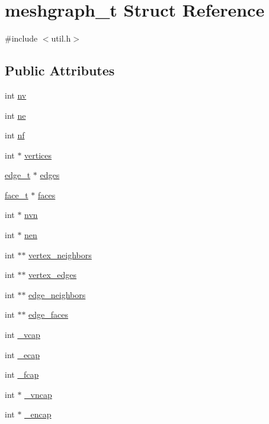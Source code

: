 \hypertarget{structmeshgraph__t}{
\section{meshgraph\_\-t Struct Reference}
\label{structmeshgraph__t}
}


{\ttfamily \#include $<$util.h$>$}

\subsection*{Public Attributes}
\begin{DoxyCompactItemize}
\item 
int \hyperlink{structmeshgraph__t_a5b1f3991b63e3058c62127b0eae471da}{nv}
\item 
int \hyperlink{structmeshgraph__t_a1c0d7fde877f177d8af304bca4d4d6dc}{ne}
\item 
int \hyperlink{structmeshgraph__t_aaf85a4e306e770d5125858bd11375de7}{nf}
\item 
int $\ast$ \hyperlink{structmeshgraph__t_a1bea06e4f4be54551784cbfb2b0f7251}{vertices}
\item 
\hyperlink{structedge__t}{edge\_\-t} $\ast$ \hyperlink{structmeshgraph__t_a561abab41d4b6c5e2075e13817db7d7c}{edges}
\item 
\hyperlink{structface__t}{face\_\-t} $\ast$ \hyperlink{structmeshgraph__t_a0f08e0c7b5dd3defe8344b7c84102561}{faces}
\item 
int $\ast$ \hyperlink{structmeshgraph__t_a42d2a2ef33f28c82985126e8f7ad52c8}{nvn}
\item 
int $\ast$ \hyperlink{structmeshgraph__t_a6ed8a0886b7dd389440715890d3b8808}{nen}
\item 
int $\ast$$\ast$ \hyperlink{structmeshgraph__t_af65bff1e233044c3df4cf61fc3678dec}{vertex\_\-neighbors}
\item 
int $\ast$$\ast$ \hyperlink{structmeshgraph__t_a1749608b66f96c274a338bc6f14146ee}{vertex\_\-edges}
\item 
int $\ast$$\ast$ \hyperlink{structmeshgraph__t_a5112d33e704027091a927cd4b2fa674d}{edge\_\-neighbors}
\item 
int $\ast$$\ast$ \hyperlink{structmeshgraph__t_a04c7ea717e38637f3ff8976734865f81}{edge\_\-faces}
\item 
int \hyperlink{structmeshgraph__t_a53989e19be0be5ff3e487f944f59b9fb}{\_\-vcap}
\item 
int \hyperlink{structmeshgraph__t_abd55445fb633d3df6cf0850531ab795e}{\_\-ecap}
\item 
int \hyperlink{structmeshgraph__t_ad99ab4117861414c0ecbb0ec184a5583}{\_\-fcap}
\item 
int $\ast$ \hyperlink{structmeshgraph__t_a6a88c0b7244de6d5df3540c36af2f58b}{\_\-vncap}
\item 
int $\ast$ \hyperlink{structmeshgraph__t_a83379b06ad195ba450afab680123d2d1}{\_\-encap}
\end{DoxyCompactItemize}


